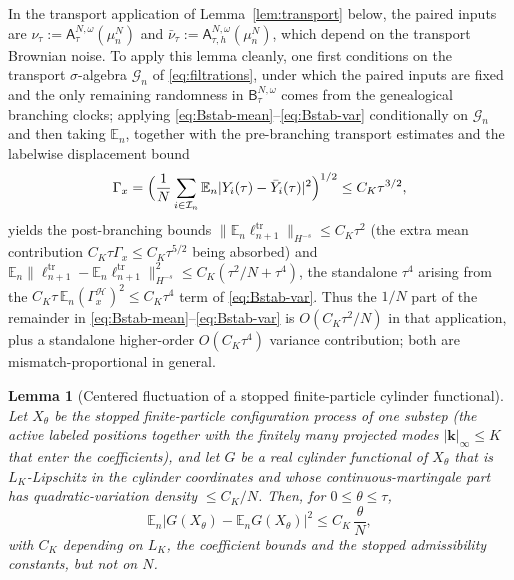 \documentclass[a4paper,fleqn]{cas-sc}
\newtheorem{lemma}[theorem]{Lemma}
\theoremstyle{definition}
\theoremstyle{remark}
\begin{document}
In the transport application of Lemma~\ref{lem:transport} below, the paired
inputs are $\nu_\tau:=\mathsf A^{N,\omega}_\tau(\mu^N_n)$ and
$\bar\nu_\tau:=\mathsf A^{N,\omega}_{\tau,h}(\mu^N_n)$, which depend on the
transport Brownian noise. To apply this lemma cleanly, one first conditions on
the transport $\sigma$-algebra $\mathcal G_n$ of \eqref{eq:filtrations}, under
which the paired inputs are fixed and the only
remaining randomness in $\mathsf B^{N,\omega}_\tau$ comes from the genealogical
branching clocks; applying \eqref{eq:Bstab-mean}--\eqref{eq:Bstab-var} conditionally
on $\mathcal G_n$ and then taking $\mathbb E_n$, together with the
pre-branching transport estimates and the labelwise displacement bound
\[
\Gamma_x=\Bigl(\frac1N\sum_{i\in\mathcal I_n}\mathbb E_n|Y_i(\tau)-\bar Y_i(\tau)|^2\Bigr)^{1/2}\le C_K\tau^{3/2},
\]
yields the post-branching bounds $\|\mathbb E_n\ell^{\mathrm{tr}}_{n+1}\|_{H^{-s}}\le C_K\tau^2$
(the extra mean contribution $C_K\tau\Gamma_x\le C_K\tau^{5/2}$ being absorbed) and
$\mathbb E_n\|\ell^{\mathrm{tr}}_{n+1}-\mathbb E_n\ell^{\mathrm{tr}}_{n+1}\|_{H^{-s}}^2
\le C_K(\tau^2/N+\tau^4)$, the standalone $\tau^4$ arising from the
$C_K\tau\,\mathbb E_n(\Gamma_x^{\mathcal H})^2\le C_K\tau^4$ term of
\eqref{eq:Bstab-var}. Thus the $1/N$ part of the remainder in
\eqref{eq:Bstab-mean}--\eqref{eq:Bstab-var} is $O(C_K\tau^2/N)$ in that
application, plus a standalone higher-order $O(C_K\tau^4)$ variance contribution;
both are mismatch-proportional in general.

\begin{lemma}[Centered fluctuation of a stopped finite-particle cylinder functional]\label{lem:cyl-centered}
Let $X_\theta$ be the stopped finite-particle configuration process of one substep (the
active labeled positions together with the finitely many projected modes
$|\mathbf k|_\infty\le K$ that enter the coefficients), and let $G$ be a real cylinder
functional of $X_\theta$ that is $L_K$-Lipschitz in the cylinder coordinates and whose
continuous-martingale part has quadratic-variation density $\le C_K/N$. Then, for
$0\le\theta\le\tau$,
\begin{equation}\label{eq:cyl-centered}
\mathbb E_n\bigl|G(X_\theta)-\mathbb E_nG(X_\theta)\bigr|^2\le C_K\,\frac\theta N,
\end{equation}
with $C_K$ depending on $L_K$, the coefficient bounds and the stopped admissibility
constants, but not on $N$.
\end{lemma}
\end{document}
